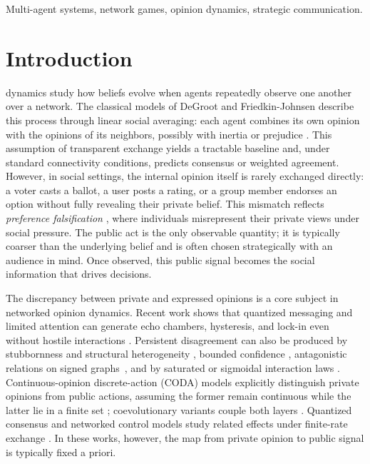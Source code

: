 \documentclass[journal,twoside,web]{ieeecolor}
\begin{document}
\begin{IEEEkeywords}
    Multi-agent systems, network games, opinion dynamics, strategic communication.
\end{IEEEkeywords}
\section{Introduction}
\label{sec:intro}

 dynamics study how beliefs evolve when agents repeatedly observe one another over a network. The classical models of DeGroot and Friedkin-Johnsen describe this process through linear social averaging: each agent combines its own opinion with the opinions of its neighbors, possibly with inertia or prejudice \cite{degroot1974,friedkin1990}. This assumption of transparent exchange yields a tractable baseline and, under standard connectivity conditions, predicts consensus or weighted agreement.
However, in social settings, the internal opinion itself is rarely exchanged directly: a voter casts a ballot, a user posts a rating, or a group member endorses an option without fully revealing their private belief. This mismatch reflects \emph{preference falsification} \cite{kuran1995private}, where individuals misrepresent their private views under social pressure. The public act is the only observable quantity; it is typically coarser than the underlying belief and is often chosen strategically with an audience in mind. Once observed, this public signal becomes the social information that drives decisions.

The discrepancy between private and expressed opinions is a core subject in networked opinion dynamics. Recent work shows that quantized messaging and limited attention can generate echo chambers, hysteresis, and lock-in even without hostile interactions \cite{kong2026messaging}. Persistent disagreement can also be produced by stubbornness and structural heterogeneity \cite{acemoglu2013opiniona,ghaderi2014opinion}, bounded confidence \cite{deffuant2000mixing,hegselmann2002opinion,etesami2015game},
antagonistic relations on signed graphs~\cite{altafini2013consensus,liu2017exponential}, and by saturated or sigmoidal interaction laws \cite{bizyaeva2023nonlinear,couthures2025from}.
Continuous-opinion discrete-action (CODA) models explicitly distinguish private opinions from public actions, assuming the former remain continuous while the latter lie in a finite set \cite{martins2008continuous,martins2010importance}; coevolutionary variants couple both layers \cite{aghbolagh2023coevolutionary}. Quantized consensus and networked control models study related effects under finite-rate exchange \cite{chowdhury2016continuous,ceragioli2018consensus,carli2010gossip,etesami2015convergence}. In these works, however, the map from private opinion to public signal is typically fixed a priori.
\end{document}
